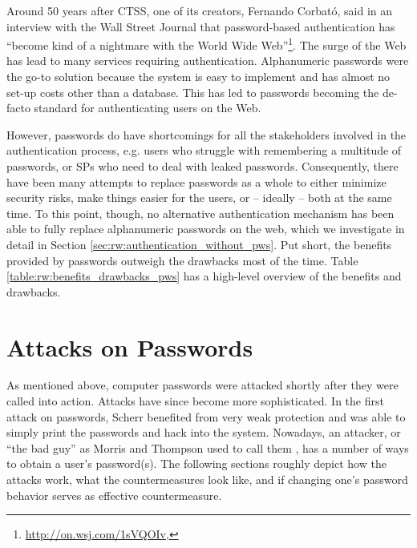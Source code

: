 

Around 50 years after CTSS, one of its creators, Fernando Corbató, said in an interview with the Wall Street Journal that password-based authentication has ``become kind of a nightmare with the World Wide Web''\footnote{\label{foot:corbato_regrets}\url{http://on.wsj.com/1sVQOIv}, }. The surge of the Web has lead to many services requiring authentication. Alphanumeric passwords were the go-to solution because the system is easy to implement and has almost no set-up costs other than a database. This has led to passwords becoming the de-facto standard for authenticating users on the Web.

However, passwords do have shortcomings for all the stakeholders involved in the authentication process, e.g. users who struggle with remembering a multitude of passwords, or \glspl{SP} who need to deal with leaked passwords. Consequently, there have been many attempts to replace passwords as a whole to either minimize security risks, make things easier for the users, or -- ideally -- both at the same time. To this point, though, no alternative authentication mechanism has been able to fully replace alphanumeric passwords on the web, which we investigate in detail in Section \ref{sec:rw:authentication_without_pws}. Put short, the benefits provided by passwords outweigh the drawbacks most of the time. Table \ref{table:rw:benefits_drawbacks_pws} has a high-level overview of the benefits and drawbacks.




\section{Attacks on Passwords}\label{sec:rw:attack_vectors}
As mentioned above, computer passwords were attacked shortly after they were called into action. Attacks have since become more sophisticated. In the first attack on passwords, Scherr benefited from very weak protection and was able to simply print the passwords and hack into the system. Nowadays, an attacker, or ``the bad guy'' as Morris and Thompson used to call them \cite{Morris1979PasswordSecurity}, has a number of ways to obtain a user's password(s). The following sections roughly depict how the attacks work, what the countermeasures look like, and if changing one's password behavior serves as effective countermeasure. 



